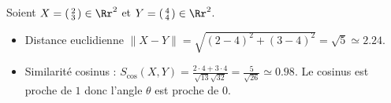 \documentclass[11pt,class=report,crop=false]{standalone}
\begin{document}


\begin{exemple}
Soient $X = \left(\begin{smallmatrix}2 \\ 3 \end{smallmatrix}\right) \in \Rr^2$ et $Y = \left(\begin{smallmatrix}4 \\ 4 \end{smallmatrix}\right)\in \Rr^2$.


\begin{itemize}
	\item Distance euclidienne $\|X-Y\| = \sqrt{(2-4)^2 + (3-4)^2} = \sqrt5 \simeq 2.24$.
	 
	\item Similarité cosinus : $S_{\cos}(X,Y) = \frac{2\cdot 4 + 3\cdot4}{\sqrt{13}\sqrt{32}} = \frac{5}{\sqrt{26}} \simeq 0.98$. Le cosinus est proche de $1$ donc l'angle $\theta$ est proche de $0$.
\end{itemize}	
\end{exemple}
\end{document}
